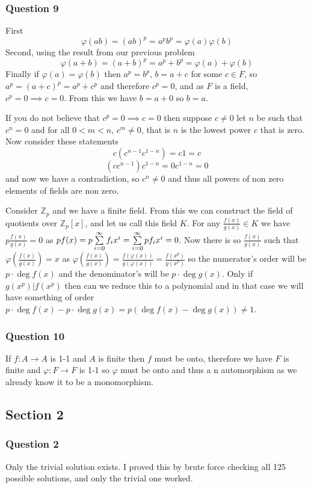 \documentclass{article}
\begin{document}
\subsubsection{Question 9}
First $$\varphi(ab) = (ab)^p = a^pb^p = \varphi(a)\varphi(b)$$ Second, using the result from our previous problem $$\varphi(a+b) = (a+b)^p = a^p+b^p = \varphi(a) + \varphi(b)$$ Finally if $\varphi(a) = \varphi(b)$ then $a^p = b^p$, $b = a+c$ for some $c \in F$, so $a^p=(a+c)^p = a^p+c^p$ and therefore $c^p = 0$, and as $F$ is a field, $c^p = 0 \implies c = 0$. From this we have $b=a+0$ so $b=a$.

If you do not believe that $c^p = 0 \implies c = 0$ then suppose $c\not=0$ let  $n$ be such that $c^n = 0$ and for all $0< m < n$, $c^m \not = 0$, that is $n$ is the lowest power $c$ that is zero. Now consider these statements $$c(c^{n-1}c^{1-n}) = c1 = c$$ $$(cc^{n-1})c^{1-n} = 0c^{1-n} = 0$$ and now we have a contradiction, so $c^n\not=0$ and thus all powers of non zero elements of fields are non zero.

 Consider $\mathbb Z_p$ and we have a finite field. From this we can construct the field of quotients over $\mathbb Z_p[x]$, and let us call this field $K$. For any $\frac{f(x)}{g(x)} \in K$ we have $p\frac{f(x)}{g(x)} = 0$ as $pf(x) = p\sum\limits_{i=0}^{\infty}  {f_ix^i}  = \sum\limits_{i=0}^{\infty}  {pf_ix^i}  = 0$. Now there is so $\frac{f(x)}{g(x)}$ such that $\varphi\left(\frac{f(x)}{g(x)}\right)=x$ as $\varphi\left(\frac{f(x)}{g(x)} \right)=\frac{f(\varphi(x))}{g(\varphi(x))}=\frac{f(x^p)}{g(x^p)}$ so the numerator's order will be $p\cdot \deg f(x)$ and the denominator's will be $p\cdot \deg g(x)$. Only if $g(x^p)|f(x^p)$ then can we reduce this to a polynomial and in that case we will have something of order $p\cdot \deg f(x) - p\cdot \deg g(x) = p(\deg f(x) - \deg g(x))\not = 1$.

\subsubsection{Question 10}
If $f:A\to A$ is 1-1 and $A$ is finite then $f$ must be onto, therefore we have $F$ is finite and $\varphi:F\to F$ is 1-1 so $\varphi$ must be onto and thus a n automorphism as we already know it to be a monomorphism.

\subsection{Section 2}
\subsubsection{Question 2}
Only the trivial solution exists. I proved this by brute force checking all 125 possible solutions, and only the trivial one worked.
\end{document}
